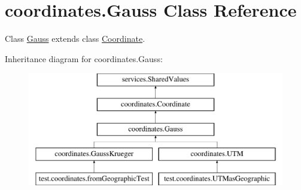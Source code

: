 \hypertarget{classcoordinates_1_1_gauss}{}\section{coordinates.\+Gauss Class Reference}
\label{classcoordinates_1_1_gauss}


Class \hyperlink{classcoordinates_1_1_gauss}{Gauss} extends class \hyperlink{classcoordinates_1_1_coordinate}{Coordinate}.  


Inheritance diagram for coordinates.\+Gauss\+:\begin{figure}[H]
\begin{center}
\leavevmode
\includegraphics[height=5.000000cm]{classcoordinates_1_1_gauss}
\end{center}
\end{figure}
